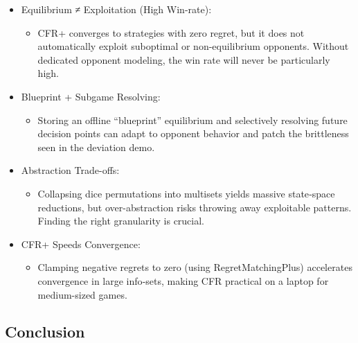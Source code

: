 \documentclass[
]{article}
\begin{document}
\begin{itemize}
\item
  Equilibrium ≠ Exploitation (High Win-rate):

  \begin{itemize}
  \item
    CFR+ converges to strategies with zero regret, but it does not
    automatically exploit suboptimal or non-equilibrium opponents.
    Without dedicated opponent modeling, the win rate will never be
    particularly high.
  \end{itemize}
\item
  Blueprint + Subgame Resolving:

  \begin{itemize}
  \item
    Storing an offline ``blueprint'' equilibrium and selectively
    resolving future decision points can adapt to opponent behavior and
    patch the brittleness seen in the deviation demo.
  \end{itemize}
\item
  Abstraction Trade-offs:

  \begin{itemize}
  \item
    Collapsing dice permutations into multisets yields massive
    state‐space reductions, but over-abstraction risks throwing away
    exploitable patterns. Finding the right granularity is crucial.
  \end{itemize}
\item
  CFR+ Speeds Convergence:

  \begin{itemize}
  \item
    Clamping negative regrets to zero (using RegretMatchingPlus)
    accelerates convergence in large info‐sets, making CFR practical on
    a laptop for medium-sized games.
  \end{itemize}
\end{itemize}

\subsection{\texorpdfstring{\textbf{Conclusion}}{Conclusion}}\label{conclusion}
\end{document}
